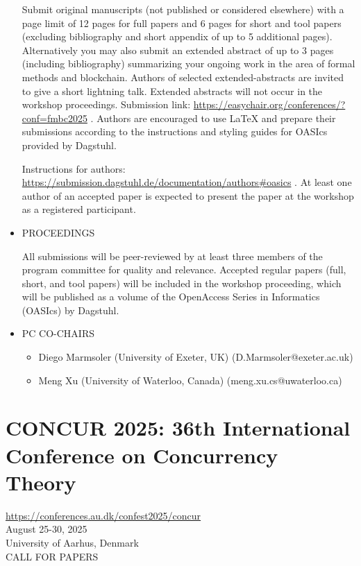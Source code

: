 \documentclass[prodmode,acmtecs]{acmsmall} %
\begin{document}
\begin{itemize}
  Submit original manuscripts (not published or considered elsewhere) with a page limit of 12 pages for full papers and 6 pages for short and tool papers (excluding bibliography and short appendix of up to 5 additional pages). Alternatively you may also submit an extended abstract of up to 3 pages (including bibliography) summarizing your ongoing work in the area of formal methods and blockchain. Authors of selected extended-abstracts are invited to give a short lightning talk. Extended abstracts will not occur in the workshop proceedings. Submission link: \href{https://easychair.org/conferences/?conf=fmbc2025}{https://easychair.org/conferences/?conf=fmbc2025} . Authors are encouraged to use LaTeX and prepare their submissions according to the instructions and styling guides for OASIcs provided by Dagstuhl. 
 
  Instructions for authors: \href{https://submission.dagstuhl.de/documentation/authors#oasics}{https://submission.dagstuhl.de/documentation/authors\#oasics} . At least one author of an accepted paper is expected to present the paper at the workshop as a registered participant. 
 
\item  PROCEEDINGS  
 
  All submissions will be peer-reviewed by at least three members of the program committee for quality and relevance. Accepted regular papers (full, short, and tool papers) will be included in the workshop proceeding, which will be published as a volume of the OpenAccess Series in Informatics (OASIcs) by Dagstuhl. 
 
\item  PC CO-CHAIRS 
 
\begin{itemize}\item  Diego Marmsoler (University of Exeter, UK) (D.Marmsoler@exeter.ac.uk)
\item  Meng Xu (University of Waterloo, Canada) (meng.xu.cs@uwaterloo.ca)
\end{itemize} 
\end{itemize}\section{CONCUR 2025: 36th International Conference on Concurrency Theory}\label{CONCUR2025}  \href{https://conferences.au.dk/confest2025/concur}{https://conferences.au.dk/confest2025/concur}\\ 
  August 25-30, 2025\\ 
  University of Aarhus, Denmark\\ 
CALL FOR PAPERS 
\end{document}
